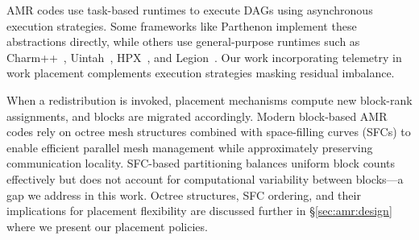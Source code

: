 AMR codes use task-based runtimes to execute DAGs using asynchronous execution strategies.
Some frameworks like Parthenon implement these abstractions directly, while others use
general-purpose runtimes such as Charm++~\cite{Acun2014:Charm++}, Uintah~\cite{Meng2010:Uintah},
HPX~\cite{Daiss2024:HPX}, and Legion~\cite{Bauer2012:Legion}.
Our work incorporating telemetry in work placement complements execution strategies masking
residual imbalance.


When a redistribution is invoked, placement mechanisms compute new block-rank assignments, and
blocks are migrated accordingly.
Modern block-based AMR codes rely on octree mesh structures combined with space-filling curves
(SFCs) to enable efficient parallel mesh management while approximately preserving communication
locality.
SFC-based partitioning balances uniform block counts effectively but does not account for
computational variability between blocks---a gap we address in this work.
Octree structures, SFC ordering, and their implications for placement flexibility are discussed
further in \S\ref{sec:amr:design} where we present our placement policies.


